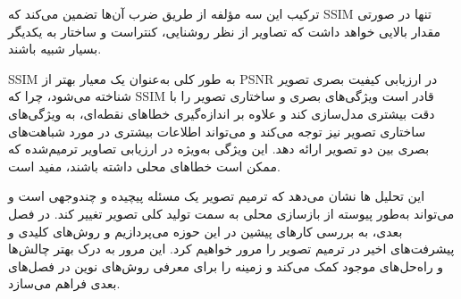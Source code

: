 ترکیب این سه مؤلفه از طریق ضرب آن‌ها تضمین می‌کند که SSIM تنها در صورتی مقدار بالایی خواهد داشت که تصاویر از نظر روشنایی، کنتراست و ساختار به یکدیگر بسیار شبیه باشند.

SSIM
به طور کلی به‌عنوان یک معیار بهتر از PSNR در ارزیابی کیفیت بصری تصویر شناخته می‌شود، چرا که SSIM قادر است ویژگی‌های بصری و ساختاری تصویر را با دقت بیشتری مدل‌سازی کند و علاوه بر اندازه‌گیری خطاهای نقطه‌ای، به ویژگی‌های ساختاری تصویر نیز توجه می‌کند و می‌تواند اطلاعات بیشتری در مورد شباهت‌های بصری بین دو تصویر ارائه دهد. این ویژگی به‌ویژه در ارزیابی تصاویر ترمیم‌شده که ممکن است خطاهای محلی داشته باشند، مفید است.



این تحلیل ها نشان می‌دهد که ترمیم تصویر یک مسئله پیچیده و چندوجهی است و می‌تواند به‌طور پیوسته از بازسازی محلی به سمت تولید کلی تصویر تغییر کند. در فصل بعدی، به بررسی کارهای پیشین در این حوزه می‌پردازیم و روش‌های کلیدی و پیشرفت‌های اخیر در ترمیم تصویر را مرور خواهیم کرد. این مرور به درک بهتر چالش‌ها و راه‌حل‌های موجود کمک می‌کند و زمینه را برای معرفی روش‌های نوین در فصل‌های بعدی فراهم می‌سازد.
